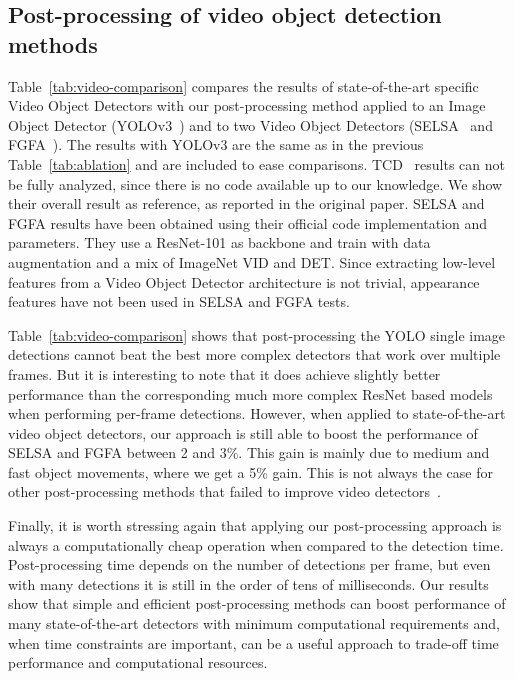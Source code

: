 \documentclass[letterpaper, 10 pt, conference]{ieeeconf}
\begin{document}
\subsection{Post-processing of video object detection methods}


Table~\ref{tab:video-comparison} compares the results of state-of-the-art specific Video Object Detectors with our post-processing method applied to an Image Object Detector (YOLOv3~\cite{redmon2018yolov3}) and to two Video Object Detectors (SELSA~\cite{wu2019selsa} and FGFA~\cite{Zhu_2017_ICCV}). The results with YOLOv3 are the same as in the previous Table~\ref{tab:ablation} and are included to ease comparisons. TCD~\cite{DBLP:journals/corr/abs-1811-11167} results can not be fully analyzed, since there is no code available up to our knowledge. We show their overall result as reference, as reported in the original paper. SELSA and FGFA results have been obtained using their official code implementation and parameters. They use a ResNet-101 as backbone and train with data augmentation and a mix of ImageNet VID and DET. Since extracting low-level features from a Video Object Detector architecture is not trivial, appearance features have not been used in SELSA and FGFA tests.

Table~\ref{tab:video-comparison} shows that post-processing the YOLO single image detections cannot beat the best more complex detectors that work over multiple frames. 
But it is interesting to note that it does achieve slightly better performance than the corresponding much more complex ResNet based models when performing per-frame detections. 
However, when applied to state-of-the-art video object detectors, our approach is still able to boost the performance of SELSA and FGFA between 2 and $3\%$. This gain is mainly due to medium and fast object movements, where we get a 5\% gain. This is not always the case for other post-processing methods that failed to improve video detectors~\cite{wu2019selsa}.


Finally, it is worth stressing again that applying our post-processing approach is always a computationally cheap operation when compared to the detection time.  Post-processing time depends on the number of detections per frame, 
but even with many detections 
it is still in the order of tens of milliseconds. 
Our results show that simple and efficient post-processing methods can boost performance of many state-of-the-art detectors with minimum computational requirements and, when time constraints are important, can be a useful approach to trade-off time performance and computational resources.
\end{document}
